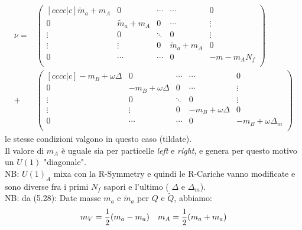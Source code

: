 \documentclass[a4paper,12pt]{report}
\begin{document}
\begin{align*}
\nu = &
\begin{pmatrix}[c c c c|c]
		\tilde m_a + m_A 	& 0 		& \cdots 	& \cdots 	& 0 \\
		0 			 & \tilde m_a + m_A 	& 0 &\cdots & \vdots \\
		\vdots 		& 0 		& \ddots & 0 & \vdots \\
		\vdots & \vdots & 0 & \tilde m_a + m_A 	 & 0 \\
		\hline 
		0 & \cdots & \cdots & 0 & -m  - m_A N_f\\
\end{pmatrix} \\
+ & 
\begin{pmatrix}[c c c c|c]
		- m_B + \omega \Delta 	& 0 		& \cdots 	& \cdots 	& 0 \\
		0 			 & - m_B + \omega \Delta  & 0 &\cdots & \vdots \\
		\vdots 		& 0 		& \ddots & 0 & \vdots \\
		\vdots & \vdots & 0 & - m_B + \omega \Delta & 0 \\
		\hline 
		0 & \cdots & \cdots & 0 & -m_B + \omega \Delta_m\\
\end{pmatrix}
\end{align*}
le stesse condizioni valgono in questo caso (tildate).\\
Il valore di $m_A$ è uguale sia per particelle \emph{left} e \emph{right}, e genera per questo motivo un $U(1)$ "diagonale".\\
NB: $U(1)_A$ mixa con la R-Symmetry e quindi le R-Cariche vanno modificate e sono diverse fra i primi $N_f$ sapori e l'ultimo ( $\Delta $ e $\Delta_m$).\\

NB: da \citep{Aharony:2013dha} (5.28):
Date masse $m_a$ e $\tilde m_a$ per $Q$ e $\tilde{Q}$, abbiamo:
$$
	m_V = {1 \over 2 }( m_a -  m_a) \quad m_A = {1 \over 2 }( m_a + m_a)
$$
\end{document}
